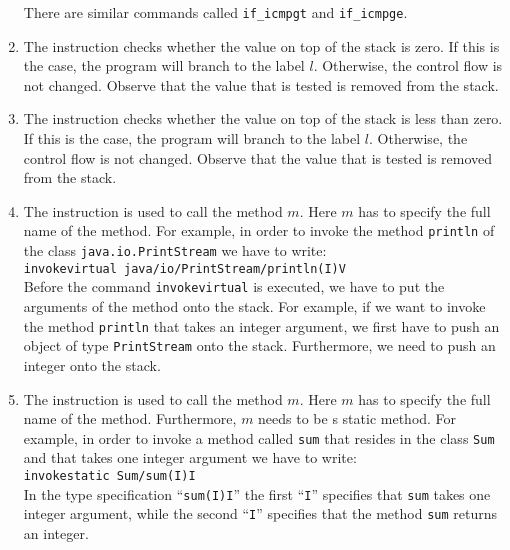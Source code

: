 \begin{enumerate}
      There are similar commands called \texttt{if\_icmpgt} and \texttt{if\_icmpge}.

\item The instruction 
      checks whether the value on top of the stack is zero.  If this is the case, the program will branch
      to the label $l$.  Otherwise, the control flow is not changed.  Observe that the value that is
      tested is removed from the stack.

\item The instruction 
      checks whether the value on top of the stack is less than zero.  If this is the case, the program
      will branch to the label $l$.  Otherwise, the control flow is not changed.  Observe that the value
      that is tested is removed from the stack.

\item The instruction 
      is used to call the method $m$.  Here $m$ has to  specify the full name of the method.
      For example, in order to invoke the method \texttt{println} of the class
      \texttt{java.io.PrintStream} we have to write:
      \\[0.2cm]
      \hspace*{1.3cm}
      \texttt{invokevirtual java/io/PrintStream/println(I)V}
      \\[0.2cm]
      Before the command \texttt{invokevirtual} is executed, we have to put the arguments of the method
      onto the stack.  For example, if we want to invoke the method \texttt{println} that takes an integer
      argument, we first have to push an object of type \texttt{PrintStream} onto the stack.  Furthermore,
      we need to push an integer onto the stack.

\item The instruction 
      is used to call the method $m$.  Here $m$ has to  specify the full name of the method.
      Furthermore, $m$ needs to be s static method.
      For example, in order to invoke a  method called \texttt{sum} that resides in the class \texttt{Sum}
      and that takes one integer argument we have to write:
      \\[0.2cm]
      \hspace*{1.3cm}
      \texttt{invokestatic  Sum/sum(I)I}
      \\[0.2cm]
      In the type specification ``\texttt{sum(I)I}'' the first ``\texttt{I}'' specifies that \texttt{sum}
      takes one integer argument, while the second ``\texttt{I}'' specifies that the method \texttt{sum}
      returns an integer.


\end{enumerate}
